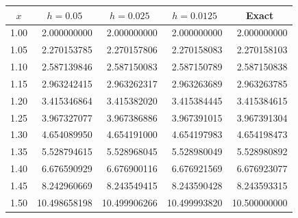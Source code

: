 \documentclass[dvips]{book}
\renewcommand{\exer}[1]{\par\medskip\;\noindent{\color{red}\bf #1.}}
\numberwithin{example}{section}
\numberwithin{equation}{section}
\numberwithin{theorem}{section}
\numberwithin{table}{section}
\numberwithin{figure}{section}
\begin{document}
\exer{3.3.8}
{\small
\begin{tabular}{|c|r|r|r|r|}\hline
\multicolumn{1}{|c|}{$x$}&
\multicolumn{1}{|c|}{$h=0.05$}&
\multicolumn{1}{|c|}{$h=0.025$}&
\multicolumn{1}{|c|}{$h=0.0125$}&
\multicolumn{1}{|c|}{Exact}\\ \hline
1.00 &  2.000000000 &  2.000000000 &  2.000000000 &  2.000000000 \\
1.05 &  2.270153785 &  2.270157806 &  2.270158083 &  2.270158103 \\
1.10 &  2.587139846 &  2.587150083 &  2.587150789 &  2.587150838 \\
1.15 &  2.963242415 &  2.963262317 &  2.963263689 &  2.963263785 \\
1.20 &  3.415346864 &  3.415382020 &  3.415384445 &  3.415384615 \\
1.25 &  3.967327077 &  3.967386886 &  3.967391015 &  3.967391304 \\
1.30 &  4.654089950 &  4.654191000 &  4.654197983 &  4.654198473 \\
1.35 &  5.528794615 &  5.528968045 &  5.528980049 &  5.528980892 \\
1.40 &  6.676590929 &  6.676900116 &  6.676921569 &  6.676923077 \\
1.45 &  8.242960669 &  8.243549415 &  8.243590428 &  8.243593315 \\
1.50 & 10.498658198 & 10.499906266 & 10.499993820 & 10.500000000 \\
\hline
\end{tabular}}
\end{document}
